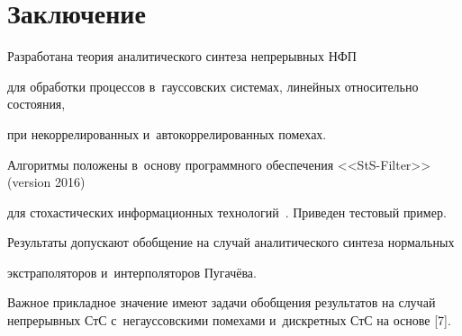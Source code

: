 \section{Заключение}





Разработана теория аналитического синтеза непрерывных  НФП


для обработки процессов в~гауссовских  системах, линейных относительно состояния, 


при некоррелированных и~автокоррелированных помехах.





Алгоритмы положены в~основу программного обеспечения <<StS-Filter>> (version 2016) 


для стохастических информационных технологий~\cite{6-sin}. Приведен тестовый пример.





Результаты допускают обобщение на случай аналитического синтеза нормальных 


экстраполяторов и~интерполяторов Пугачёва.





Важное прикладное значение имеют задачи обобщения результатов на случай непрерывных СтС с~негауссовскими помехами и~дискретных СтС на основе [7].






